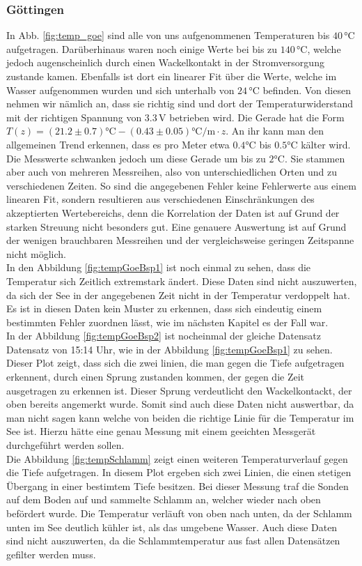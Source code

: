 \documentclass[12pt,a4paper,titlepage,headinclude,bibtotoc]{scrartcl}
\numberwithin{equation}{subsection}
\begin{document}
\subsubsection{Göttingen}
In Abb. \ref{fig:temp_goe} sind alle von uns aufgenommenen Temperaturen bis $40\,\si{\celsius}$ aufgetragen.
Darüber\-hinaus waren noch einige Werte bei bis zu $140\,\si{\celsius}$, welche jedoch augenscheinlich durch einen Wackelkontakt in der Stromversorgung zustande kamen.
Ebenfalls ist dort ein linearer Fit über die Werte, welche im Wasser aufgenommen wurden und sich unterhalb von $24\,\si{\celsius}$ befinden.
Von diesen nehmen wir nämlich an, dass sie richtig sind und dort der Temperaturwiderstand mit der richtigen Spannung von $3.3\,$V betrieben wird.
Die Gerade hat die Form $T(z)=(21.2\pm 0.7)\si{\celsius}-(0.43\pm 0.05)\si{\celsius\per\meter}\cdot z$.
An ihr kann man den allgemeinen Trend erkennen, dass es pro Meter etwa $0.4\si{\celsius}$ bis  $0.5\si{\celsius}$  kälter wird.
Die Messwerte schwanken jedoch um diese Gerade um bis zu $2\si{\celsius}$.
Sie stammen aber auch von mehreren Messreihen, also von unterschiedlichen Orten und zu verschiedenen Zeiten.
So sind die angegebenen Fehler keine Fehlerwerte aus einem linearen Fit, sondern resultieren aus verschiedenen Einschränkungen des akzeptierten Wertebereichs, denn die Korrelation der Daten ist auf Grund der starken Streuung nicht besonders gut.
Eine genauere Auswertung ist auf Grund der wenigen brauchbaren Messreihen und der vergleichsweise geringen Zeitspanne nicht möglich.\\
In den Abbildung \ref{fig:tempGoeBsp1} ist noch einmal zu sehen, dass die Temperatur sich Zeitlich extremstark ändert.
Diese Daten sind nicht auszuwerten, da sich der See in der angegebenen Zeit nicht in der Temperatur verdoppelt hat.
Es ist in diesen Daten kein Muster zu erkennen, dass sich eindeutig einem bestimmten Fehler zuordnen lässt, wie im nächsten Kapitel es der Fall war.\\
In der Abbildung \ref{fig:tempGoeBsp2} ist nocheinmal der gleiche Datensatz Datensatz von 15:14 Uhr, wie in der Abbildung \ref{fig:tempGoeBsp1} zu sehen.
Dieser Plot zeigt, dass sich die zwei linien, die man gegen die Tiefe aufgetragen erkennent, durch einen Sprung zustanden kommen, der gegen die Zeit ausgetragen zu erkennen ist.
Dieser Sprung verdeutlicht den Wackelkontackt, der oben bereits angemerkt wurde.
Somit sind auch diese Daten nicht auswertbar, da man nicht sagen kann welche von beiden die richtige Linie für die Temperatur im See ist.
Hierzu hätte eine genau Messung mit einem geeichten Messgerät durchgeführt werden sollen.\\
Die Abbildung \ref{fig:tempSchlamm} zeigt einen weiteren Temperaturverlauf gegen die Tiefe aufgetragen.
In diesem Plot ergeben sich zwei Linien, die einen stetigen Übergang in einer bestimtem Tiefe besitzen.
Bei dieser Messung traf die Sonden auf dem Boden auf und sammelte Schlamm an, welcher wieder nach oben befördert wurde.
Die Temperatur verläuft von oben nach unten, da der Schlamm unten im See deutlich kühler ist, als das umgebene Wasser.
Auch diese Daten sind nicht auszuwerten, da die Schlammtemperatur aus fast allen Datensätzen gefilter werden muss.
\end{document}
